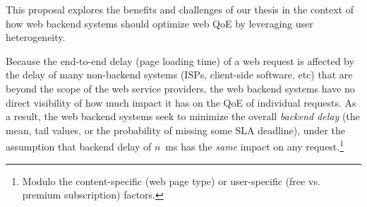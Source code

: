 This proposal explores the benefits and challenges of our thesis in the context of how web backend systems should optimize web QoE by leveraging user heterogeneity. 

Because the end-to-end delay (page loading time) of a web request is affected by the delay of many non-backend systems (ISPs, client-side software, etc) that are beyond the scope of the web service providers, the web backend systems have no direct visibility of how much impact it has on the QoE of individual requests.
As a result, the web backend systems seek to minimize the overall {\em backend delay} (\eg the mean, tail values, or the probability of missing some SLA deadline), under the assumption that backend delay of $n$~ms has the {\em same} impact on any request.\footnote{Modulo the content-specific (\eg web page type) or user-specific (\eg free vs. premium subscription) factors.}

